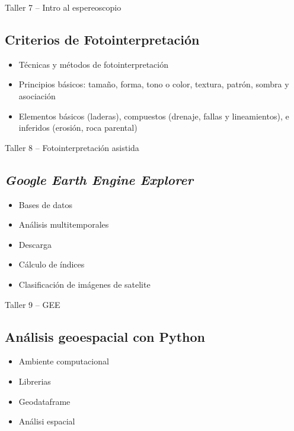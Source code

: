 \documentclass[a4paper,twoside,11pt,]{article}
\begin{document}
\begin{tcolorbox}[enhanced,width=5in,center upper,  fontupper=\large\bfseries,drop shadow southwest,sharp corners]
Taller 7 -- Intro al espereoscopio
\end{tcolorbox}

\subsection {Criterios de Fotointerpretación}
\begin{itemize}
\item Técnicas y métodos de fotointerpretación 
\item Principios básicos: tamaño, forma, tono o color, textura, patrón, sombra y asociación
\item Elementos básicos (laderas), compuestos (drenaje, fallas y lineamientos), e inferidos (erosión, roca parental)
\end{itemize}

\begin{tcolorbox}[enhanced,width=5in,center upper,  fontupper=\large\bfseries,drop shadow southwest,sharp corners]
Taller 8 -- Fotointerpretación asistida
\end{tcolorbox}

\subsection {\emph{Google Earth Engine Explorer}}
\begin{itemize}
\item Bases de datos
\item Análisis multitemporales
\item Descarga
\item Cálculo de índices
\item Clasificación de imágenes de satelite
\end{itemize}

\begin{tcolorbox}[enhanced,width=5in,center upper,  fontupper=\large\bfseries,drop shadow southwest,sharp corners]
Taller 9 -- GEE
\end{tcolorbox}

\subsection {Análisis geoespacial con Python}
\begin{itemize}
\item Ambiente computacional
\item Librerias
\item Geodataframe
\item Análisi espacial
\end{itemize}
\end{document}
